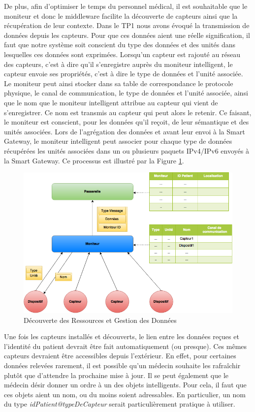 De plus, afin d'optimiser le temps du personnel médical, il est souhaitable que le moniteur et donc le middleware facilite la découverte de capteurs ainsi que la récupération de leur contexte. Dans le TP1 nous avons évoqué la transmission de données depuis les capteurs. Pour que ces données aient une réelle signification, il faut que notre système soit conscient du type des données et des unités dans lesquelles ces données sont exprimées. Lorsqu’un capteur est rajouté au réseau des capteurs, c’est à dire qu’il s’enregistre auprès du moniteur intelligent, le capteur envoie ses propriétés, c’est à dire le type de données et l’unité associée. Le moniteur peut ainsi stocker dans sa table de correspondance le protocole physique, le canal de communication, le type de données et l’unité associée, ainsi que le nom que le moniteur intelligent attribue au capteur qui vient de s’enregistrer. Ce nom est transmis au capteur qui peut alors le retenir. Ce faisant, le moniteur est conscient, pour les données qu’il reçoit, de leur sémantique et des unités associées. Lors de l’agrégation des données et avant leur envoi à la Smart Gateway, le moniteur intelligent peut associer pour chaque type de données récupérées les unités associées dans un ou plusieurs paquets IPv4/IPv6 envoyés à la Smart Gateway. Ce processus est illustré par la Figure \ref{5}.
\newline
\begin{figure}[h!]
	\hspace*{-3cm}
	\centering
	\includegraphics[width=1.5\textwidth]{Figure5.png}
	\caption{Découverte des Ressources et Gestion des Données}
	\label{5}
\end{figure}

Une fois les capteurs installés et découverts, le lien entre les données reçues et l'identité du patient devrait être fait automatiquement (ou presque). Ces mêmes capteurs devraient être accessibles depuis l'extérieur. En effet, pour certaines données relevées rarement, il est possible qu'un médecin souhaite les rafraîchir plutôt que d'attendre la prochaine mise à jour. Il se peut également que le médecin désir donner un ordre à un des objets intelligents. Pour cela, il faut que ces objets aient un nom, ou du moins soient adressables. En particulier, un nom du type \textit{idPatient@typeDeCapteur} serait particulièrement pratique à utiliser.
\newline

